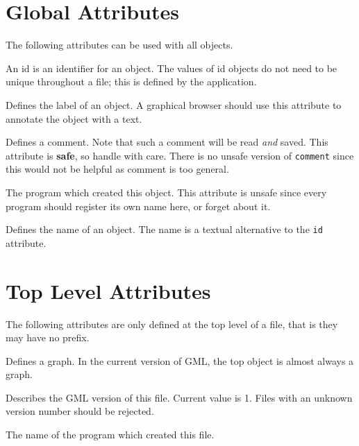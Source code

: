 \section{Global Attributes}
\label{s:GML:GlobalAttributes}

The following attributes can be used with all objects.


\begin{GMLAttributes}
  
  An id is an identifier for an object.
  The values of id objects do not need to be unique throughout a
  file; this is defined by the application.

  Defines the label of an object. A graphical browser should use
  this attribute to annotate the object with a text.
  
   Defines a comment. Note that such
  a comment will be read \emph{and} saved. This attribute is
  \textbf{safe}, so handle with care. There is no unsafe version
  of \texttt{comment} since this would not be helpful as comment
  is too general.
  
   The program which created
  this object. This attribute is unsafe since every program
  should register its own name here, or forget about it.
  
   Defines the name of an object. The
  name is a textual alternative to the \texttt{id} attribute.

\end{GMLAttributes}


\section{Top Level Attributes}
\label{s:GML:TopLevelAttributes}

The following attributes are only defined at the top level of a
file, that is they may have no prefix.

\begin{GMLAttributes}
  
   Defines a graph. In the current
  version of GML, the top object is almost always a graph.
  
   Describes the GML version of this
  file. Current value is 1. Files with an unknown version number
  should be rejected.

   The name of the program which
  created this file.

\end{GMLAttributes}

